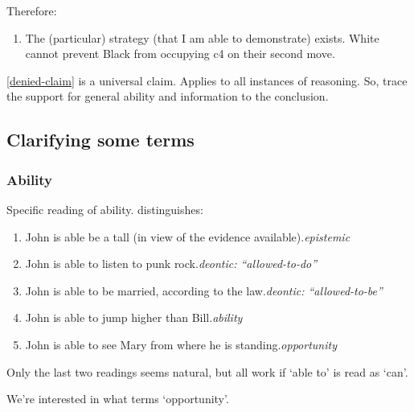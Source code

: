 \begin{note}
  Therefore:

  \begin{enumerate}[resume, label=(S\arabic*), ref=(S\arabic*)]
  \item\label{inf:sse} The (particular) strategy (that I am able to demonstrate) exists.\newline
    White cannot prevent Black from occupying c4 on their second move.
  \end{enumerate}
\end{note}

\begin{note}
  \ref{denied-claim} is a universal claim.
  Applies to all instances of reasoning.
  So, trace the support for general ability and information to the conclusion.
\end{note}

\subsection{Clarifying some terms}
\label{sec:clar-some-terms}

\subsubsection{Ability}
\label{sec:ability-1}

\begin{note}[Ability]
  Specific reading of ability.
  \textcite{Hackl:1998tt} distinguishes:
  {
    \small
    \begin{enumerate}
    \item John is able be a tall (in view of the evidence available).\hfill \emph{epistemic}
    \item John is able to listen to punk rock.\hfill \emph{deontic: ``allowed-to-do''}
    \item John is able to be married, according to the law.\hfill \emph{deontic: ``allowed-to-be''}
    \item John is able to jump higher than Bill.\hfill \emph{ability}
    \item John is able to see Mary from where he is standing.\hfill \emph{opportunity}
    \end{enumerate}
  }
  Only the last two readings seems natural, but all work if `able to' is read as `can'.

  We're interested in what \citeauthor{Hackl:1998tt} terms `opportunity'.
\end{note}

